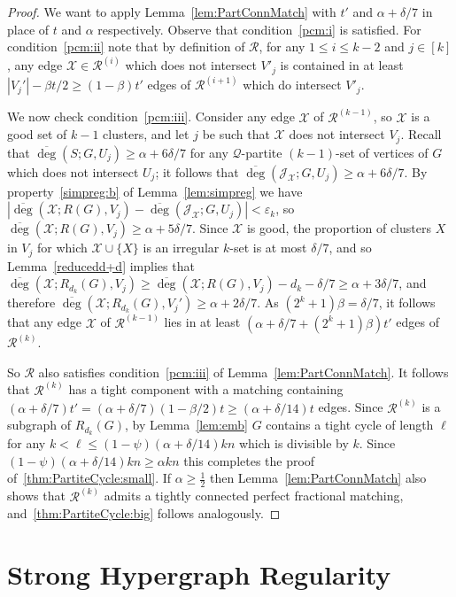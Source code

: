 \documentclass[12pt,a4paper]{amsart}
\let\eps\varepsilon
\newcommand{\cR}{\mathcal{R}}
\newcommand{\cJ}{\mathcal{J}}
\newcommand{\cX}{\mathcal{X}}
\newcommand{\Qart}{\mathcal{Q}}
\newcommand{\reldeg}{\overline{\deg}}
\begin{document}
\begin{proof}
We want to apply Lemma~\ref{lem:PartConnMatch} with
$t'$ and $\alpha + \delta/7$ in place of $t$
and $\alpha$ respectively. Observe that condition~\ref{pcm:i} is satisfied. For condition~\ref{pcm:ii} note that by definition of $\cR$, for any $1 \leq i \leq k-2$ and $j \in [k]$, any edge
$\cX \in \cR^{(i)}$ which does not intersect $V'_j$ is contained in at least
$|V_j'| - \beta t/2 \geq (1-\beta)t'$ edges of $\cR^{(i+1)}$ which
do intersect $V'_j$.

We now check condition~\ref{pcm:iii}. Consider any edge $\cX$ of $\cR^{(k-1)}$, so $\cX$ is a good set of
$k-1$ clusters, and let $j$ be such that $\cX$ does not intersect $V_j$. Recall
that $\reldeg(S;G, U_j)\ge\alpha+6\delta/7$ for any $\Qart$-partite
$(k-1)$-set of vertices of $G$ which does not intersect $U_j$; it follows that
$\reldeg(\cJ_\cX;G, U_j) \ge \alpha+6\delta/7$. By property~\ref{simpreg:b} of
Lemma~\ref{lem:simpreg} we have $|\reldeg(\cX;R(G), V_j) - \reldeg(\cJ_\cX;G,
U_j)| < \eps_k$, so $\reldeg(\cX; R(G), V_j) \ge \alpha+5\delta/7$. Since $\cX$
is good, the proportion of clusters $X$ in $V_j$ for which $\cX \cup \{X\}$ is
an irregular $k$-set is at most $\delta/7$, and so Lemma~\ref{reducedd+d}
implies that $\reldeg(\cX;R_{d_k}(G), V_j) \ge \reldeg(\cX; R(G), V_j) - d_k -
\delta/7 \geq \alpha+3\delta/7$, and therefore $\reldeg(\cX;R_{d_k}(G), V_j')
\ge \alpha + 2\delta/7$. As $(2^k+1)\beta = \delta/7$, it follows that any edge $\cX$
of $\cR^{(k-1)}$ lies in at least $(\alpha+\delta/7+(2^k+1)\beta)t'$ edges
of $\cR^{(k)}$.

So $\cR$ also satisfies condition~\ref{pcm:iii} of Lemma~\ref{lem:PartConnMatch}. It follows that $\cR^{(k)}$ has a tight component with a
matching containing $(\alpha+\delta/7) t' = (\alpha + \delta/7)(1 -
\beta/2)t \geq (\alpha + \delta/14)t$ edges. Since $\cR^{(k)}$ is a
subgraph of $R_{d_k}(G)$, by Lemma~\ref{lem:emb} $G$ contains a tight cycle of length $\ell$ for any $k < \ell \leq (1-\psi)(\alpha +
\delta/14)kn$ which is divisible by $k$. Since
$(1-\psi)(\alpha + \delta/14)kn \geq \alpha kn$ this completes the proof of~\ref{thm:PartiteCycle:small}.
If $\alpha \ge \frac{1}{2}$ then Lemma~\ref{lem:PartConnMatch} also shows
that $\cR^{(k)}$ admits a tightly connected perfect fractional matching, and~\ref{thm:PartiteCycle:big}
follows analogously.
\end{proof}

\section{Strong Hypergraph Regularity}\label{sec:reg}
\end{document}
